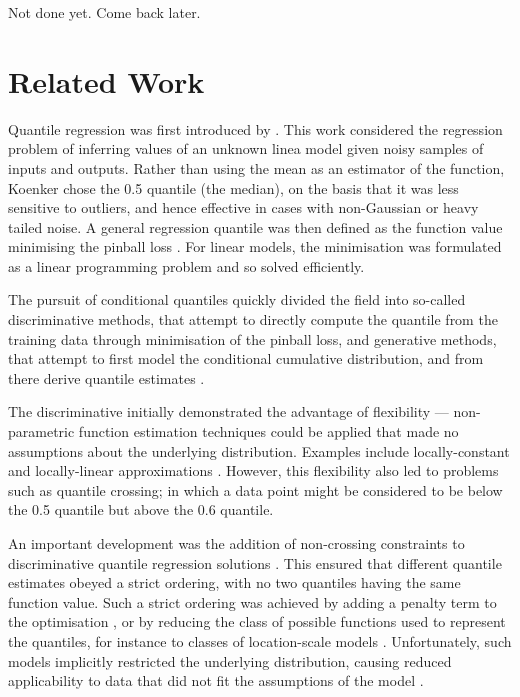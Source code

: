 \documentclass[twoside]{article} \usepackage{aistats2017}
\newcommand{\warn}[1]{{\color{RedOrange} #1}}
\begin{document}
	\warn{Not done yet. Come back later.}
	
\section{Related Work}

	Quantile regression was first introduced by \cite{Koenker1978}. This work considered the regression problem of inferring values of an unknown linea model given noisy samples of inputs and outputs. Rather than using the mean as an estimator of the function, Koenker chose the 0.5 quantile (the median), on the basis that it was less sensitive to outliers, and hence effective in cases with non-Gaussian or heavy tailed noise. A general regression quantile was then defined as the function value minimising the pinball loss \citep{Koenker1978}. For linear models, the minimisation was formulated as a linear programming problem and so solved efficiently.

	The pursuit of conditional quantiles quickly divided the field into so-called discriminative methods, that attempt to directly compute the quantile from the training data through minimisation of the pinball loss, and generative methods, that attempt to first model the conditional cumulative distribution, and from there derive quantile estimates \citep{Koenker2005}.

	The discriminative initially demonstrated the advantage of flexibility --- non-parametric function estimation techniques could be applied that made no assumptions about the underlying distribution. Examples include locally-constant and locally-linear approximations \citep{Chaudhuri1991, Yu1998}. However, this flexibility also led to problems such as quantile crossing; in which a data point might be considered to be below the 0.5 quantile but above the 0.6 quantile\cite{Koenker2005}. 

	An important development was the addition of non-crossing constraints to discriminative quantile regression solutions \citep{He1997}. This ensured that different quantile estimates obeyed a strict ordering, with no two quantiles having the same function value. Such a strict ordering was achieved by adding a penalty term to the optimisation \citep{Cole1992}, or by reducing the class of possible functions used to represent the quantiles, for instance to classes of location-scale models \citep{Koenker1984, He1997}. Unfortunately, such models implicitly restricted the underlying distribution, causing reduced applicability to data that did not fit the assumptions of the model \citep{Koenker2005}.
\end{document}
